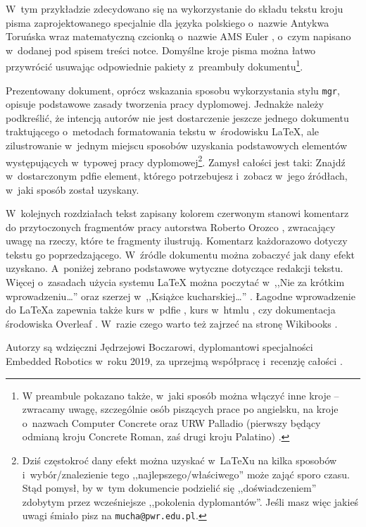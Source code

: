 W~tym przykładzie zdecydowano się na wykorzystanie do składu tekstu kroju pisma zaprojektowanego specjalnie dla języka polskiego o~nazwie Antykwa Toruńska \cite{antykwa,antykwab} wraz matematyczną czcionką o~nazwie AMS Euler \cite{eulerfont}, o~czym napisano w~dodanej pod spisem treści notce. Domyślne kroje pisma można łatwo przywrócić usuwając odpowiednie pakiety z~preambuły dokumentu\footnote{W preambule pokazano także, w~jaki sposób można włączyć inne kroje -- zwracamy uwagę, szczególnie osób piszących prace po angielsku, na kroje o~nazwach Computer Concrete oraz URW Palladio (pierwszy będący odmianą kroju Concrete Roman, zaś drugi kroju Palatino) \cite{concr, palla, antyk}.}. 

Prezentowany dokument, oprócz wskazania sposobu wykorzystania stylu \texttt{mgr}, opisuje podstawowe zasady tworzenia pracy dyplomowej. Jednakże należy podkreślić, że intencją autorów nie jest dostarczenie jeszcze jednego dokumentu traktującego o~metodach formatowania tekstu w~środowisku \LaTeX, ale zilustrowanie w~jednym miejscu sposobów uzyskania podstawowych elementów występujących w~typowej pracy dyplomowej\footnote{Dziś częstokroć dany efekt można uzyskać w~\LaTeX{}u na kilka sposobów i~wybór/znalezienie tego ,,najlepszego/właściwego'' może zająć sporo czasu. Stąd pomysł, by w~tym dokumencie podzielić się ,,doświadczeniem'' zdobytym przez wcześniejsze ,,pokolenia dyplomantów''. Jeśli masz więc jakieś uwagi śmiało pisz na \texttt{mucha@pwr.edu.pl}.}. Zamysł całości jest taki: Znajdź w~dostarczonym pdfie element, którego potrzebujesz i~zobacz w~jego źródłach, w~jaki sposób został uzyskany.

W~kolejnych rozdziałach tekst zapisany kolorem czerwonym stanowi komentarz do przytoczonych fragmentów pracy autorstwa Roberto Orozco \cite{roberto}, zwracający uwagę na rzeczy, które te fragmenty ilustrują. Komentarz każdorazowo dotyczy tekstu go poprzedzającego. W~źródle dokumentu można zobaczyć jak dany efekt uzyskano. A~poniżej zebrano podstawowe wytyczne dotyczące redakcji tekstu. Więcej o~zasadach użycia systemu \LaTeX{} można poczytać w~,,Nie za krótkim wprowadzeniu\ldots'' \cite{lshort2e} oraz szerzej w~,,Książce kucharskiej\ldots'' \cite{latex_kucharska}. Łagodne wprowadzenie do \LaTeX{}a zapewnia także kurs w~pdfie \cite{lshortpie}, kurs w~htmlu \cite{latex_kurs}, czy dokumentacja środowiska Overleaf \cite{latex_overleaf}. W~razie czego warto też zajrzeć na stronę Wikibooks \cite{latex_wiki2}.

Autorzy są wdzięczni Jędrzejowi Boczarowi, dyplomantowi specjalności Embedded Robotics w~roku 2019, za uprzejmą współpracę i~recenzję całości \cite{jedrzej}.

